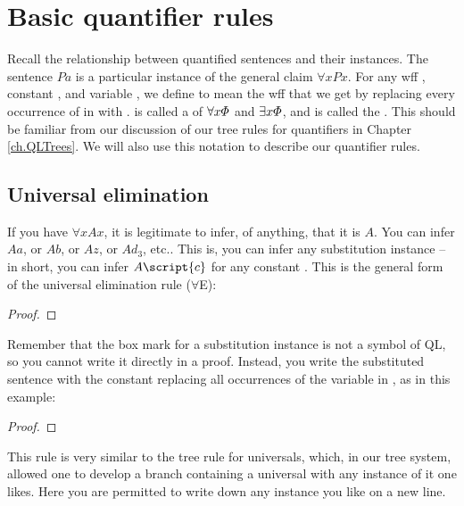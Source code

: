 \section{Basic quantifier rules}

Recall the relationship between quantified sentences and their instances. The sentence $Pa$ is a particular instance of the general claim $\forall x Px$. For any wff \metaA{}, constant , and variable , we define \metaA{} to mean the wff that we get by replacing every occurrence of  in \metaA{} with . \metaA{} is called a  of $\forall x\varPhi{}$ and $\exists x\varPhi{}$, and  is called the . This should be familiar from our discussion of our tree rules for quantifiers in Chapter \ref{ch.QLTrees}. We will also use this notation to describe our quantifier rules.



\subsection{Universal elimination}

If you have $\forall x Ax$, it is legitimate to infer, of anything, that it is $A$. You can infer $Aa$, or $Ab$, or $Az$, or $Ad_3$, etc.. This is, you can infer any substitution instance -- in short, you can infer $A\script{c}$ for any constant . This is the general form of the universal elimination rule ($\forall$E):

\begin{proof}
	 
\end{proof}


Remember that the box mark for a substitution instance is not a symbol of QL, so you cannot write it directly in a proof. Instead, you write the substituted sentence with the constant  replacing all occurrences of the variable  in \metaA{}, as in this example:

\begin{proof}
	 
	 
\end{proof}

This rule is very similar to the tree rule for universals, which, in our tree system, allowed one to develop a branch containing a universal with any instance of it one likes. Here you are permitted to write down any instance you like on a new line.

